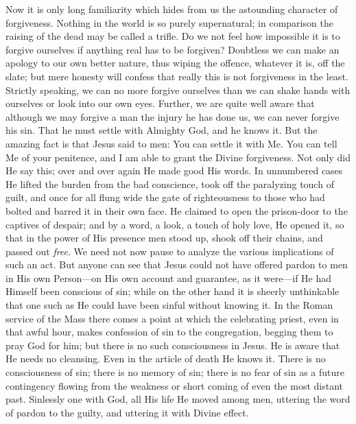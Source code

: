 \documentclass[12pt,a5paper,oneside]{book}
\begin{document}
Now it is only long familiarity which hides
from us the astounding character of forgiveness.
Nothing in the world is so purely supernatural;
in comparison the raising of the dead may be
called a trifle. Do we not feel how impossible
it is to forgive ourselves if anything real has
to be forgiven? Doubtless we can make an
apology to our own better nature, thus wiping
the offence, whatever it is, off the slate; but
mere honesty will confess that really this is
not forgiveness in the least. Strictly speaking,
we can no more forgive ourselves than we can
shake hands with ourselves or look into our own
eyes. Further, we are quite well aware that
although we may forgive a man the injury he
has done us, we can never forgive his sin. That
he must settle with Almighty God, and he
knows it. But the amazing fact is that
Jesus said to men: You can settle it with
Me. You can tell Me of your penitence,
and I am able to grant the Divine forgiveness.
Not only did He say this; over and over again
He made good His words. In unnumbered
cases He lifted the burden from the bad conscience, 
took off the paralyzing touch of guilt,
and once for all flung wide the gate of righteousness 
to those who had bolted and barred it in
their own face. He claimed to open the prison-door
to the captives of despair; and by a word,
a look, a touch of holy love, He opened it, so
that in the power of His presence men stood
up, shook off their chains, and passed out \textit{free}.
We need not now pause to analyze the various
implications of such an act. But anyone can see
that Jesus could not have offered pardon to men
in His own Person---on His own account and
guarantee, as it were---if He had Himself been
conscious of sin; while on the other hand it is
sheerly unthinkable that one such as He could
have been sinful without knowing it. In the
Roman service of the Mass there comes a point
at which the celebrating priest, even in that
awful hour, makes confession of sin to the
congregation, begging them to pray God for him;
but there is no such consciousness in Jesus.
He is aware that He needs no cleansing. Even
in the article of death He knows it. There is
no consciousness of sin; there is no memory of
sin; there is no fear of sin as a future contingency 
flowing from the weakness or short
coming of even the most distant past. Sinlessly
one with God, all His life He moved
among men, uttering the word of pardon to
the guilty, and uttering it with Divine effect.
\end{document}
